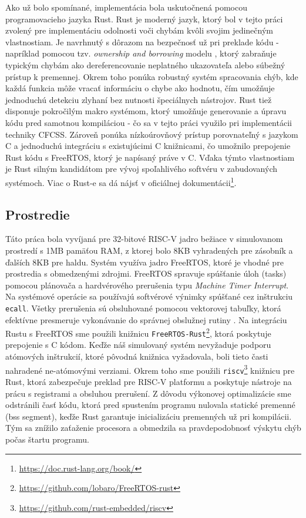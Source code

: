 \documentclass[12pt, letterpaper, slovak]{article}
\begin{document}
Ako už bolo spomínané, implementácia bola uskutočnená pomocou programovacieho jazyka Rust. Rust je moderný jazyk, ktorý bol v tejto práci zvolený pre implementáciu odolnosti voči chybám kvôli svojim jedinečným vlastnostiam. Je navrhnutý s dôrazom na bezpečnosť už pri preklade kódu - napríklad pomocou tzv. \textit{ownership and borrowing} modelu \cite{rust_book:ownership}, ktorý zabraňuje typickým chybám ako dereferencovanie neplatného ukazovateľa alebo súbežný prístup k premennej. Okrem toho ponúka robustný systém spracovania chýb, kde každá funkcia môže vracať informáciu o chybe ako hodnotu, čím umožňuje jednoduchú detekciu zlyhaní bez nutnosti špeciálnych nástrojov. Rust tiež disponuje pokročilým makro systémom, ktorý umožňuje generovanie a úpravu kódu pred samotnou kompiláciou - čo sa v tejto práci využilo pri implementácii techniky CFCSS. Zároveň ponúka nízkoúrovňový prístup porovnateľný s jazykom C a jednoduchú integráciu s existujúcimi C knižnicami, čo umožnilo prepojenie Rust kódu s FreeRTOS, ktorý je napísaný práve v C. Vďaka týmto vlastnostiam je Rust silným kandidátom pre vývoj spoľahlivého softvéru v zabudovaných systémoch. Viac o Rust-e sa dá nájsť v oficiálnej dokumentácii\footnote{\url{https://doc.rust-lang.org/book/}}.

\subsection*{Prostredie}

Táto práca bola vyvíjaná pre 32-bitové RISC-V jadro bežiace v simulovanom prostredí s 1MB pamäťou RAM, z ktorej bolo 8KB vyhradených pre zásobník a ďalších 8KB pre haldu. Systém využíva jadro FreeRTOS, ktoré je vhodné pre prostredia s obmedzenými zdrojmi. FreeRTOS spravuje spúšťanie úloh (tasks) pomocou plánovača a hardvérového prerušenia typu \textit{Machine Timer Interrupt}. Na systémové operácie sa používajú softvérové výnimky spúšťané cez inštrukciu \texttt{ecall}. Všetky prerušenia sú obsluhované pomocou vektorovej tabuľky, ktorá efektívne presmeruje vykonávanie do správnej obslužnej rutiny \cite{riscv:manual}. Na integráciu Rustu s FreeRTOS sme použili knižnicu \texttt{FreeRTOS-Rust}\footnote{\url{https://github.com/lobaro/FreeRTOS-rust}}, ktorá poskytuje prepojenie s C kódom. Keďže náš simulovaný systém nevyžaduje podporu atómových inštrukcií, ktoré pôvodná knižnica vyžadovala, boli tieto časti nahradené ne-atómovými verziami. Okrem toho sme použili \texttt{riscv}\footnote{\url{https://github.com/rust-embedded/riscv}} knižnicu pre Rust, ktorá zabezpečuje preklad pre RISC-V platformu a poskytuje nástroje na prácu s registrami a obsluhou prerušení. Z dôvodu výkonovej optimalizácie sme odstránili časť kódu, ktorá pred spustením programu nulovala statické premenné (\acrshort{bss} segment), keďže Rust garantuje inicializáciu premenných už pri kompilácii. Tým sa znížilo zaťaženie procesora a obmedzila sa pravdepodobnosť výskytu chýb počas štartu programu.
\end{document}
